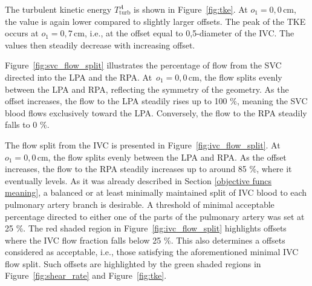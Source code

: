 The turbulent kinetic energy $T^{A}_{\mathrm{turb}}$ is shown in Figure~\ref{fig:tke}. At $o_1 = 0{,}0 \, \mathrm{cm}$, the value is again lower compared to slightly larger offsets. The peak of the TKE occurs at $o_1 = 0{,}7 \, \mathrm{cm}$, i.e., at the offset equal to 0{,}5-diameter of the IVC. The values then steadily decrease with increasing offset.

Figure~\ref{fig:svc_flow_split} illustrates the percentage of flow from the SVC directed into the LPA and the RPA. At~$o_1 = 0{,}0 \, \mathrm{cm}$, the flow splits evenly between the LPA and RPA, reflecting the symmetry of the geometry. As the offset increases, the flow to the LPA steadily rises up to 100 \%, meaning the SVC blood flows exclusively toward the LPA. Conversely, the flow to the RPA steadily falls to 0 \%. 

The flow split from the IVC is presented in Figure~\ref{fig:ivc_flow_split}. At $o_1 = 0{,}0 \, \mathrm{cm}$, the flow splits evenly between the LPA and RPA. As the offset increases, the flow to the RPA steadily increases up to around 85 \%, where it eventually levels. As it was already described in Section \ref{objective funcs meaning}, a balanced or at least minimally maintained split of IVC blood to each pulmonary artery branch is desirable. A threshold of minimal acceptable percentage directed to either one of the parts of the pulmonary artery was set at 25 \%. The red shaded region in Figure~\ref{fig:ivc_flow_split} highlights offsets where the IVC flow fraction falls below 25 \%. This also determines a offsets considered as acceptable, i.e., those satisfying the aforementioned minimal IVC flow split. Such offsets are highlighted by the green shaded regions in Figure~\ref{fig:shear_rate} and Figure~\ref{fig:tke}.


